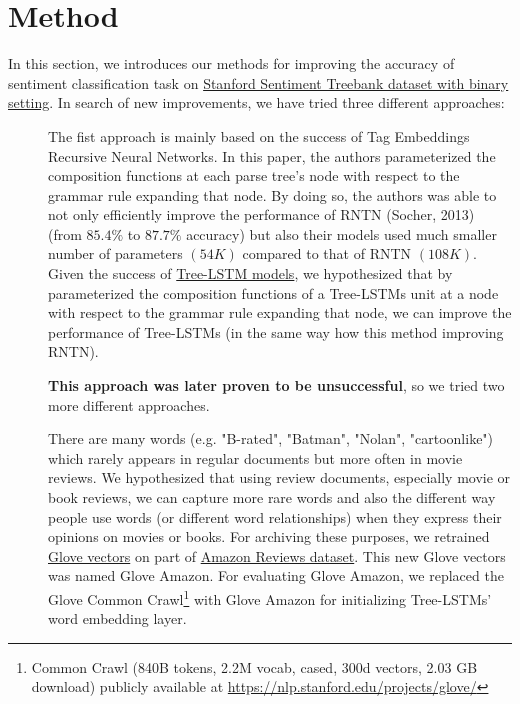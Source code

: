 \hypertarget{chap:method}{\chapter{Method}}\label{method}
In this section, we introduces our methods for improving the accuracy of sentiment classification task on \hyperref[sec:sst]{Stanford Sentiment Treebank dataset with binary setting}.
In search of new improvements, we have tried three different approaches:
\begin{description}
\item[] The fist approach is mainly based on the success of Tag Embeddings Recursive Neural Networks\cite{tag-embedding-rnn}.
In this paper, the authors parameterized the composition functions at each parse tree's node with respect to the grammar rule expanding that node. 
By doing so, the authors was able to not only efficiently improve the performance of RNTN (Socher, 2013)\cite{socher2013recursive} (from \(85.4\%\) to \(87.7\%\) accuracy) but also their models used much smaller number of parameters \((54K)\) compared to that of RNTN \((108K)\)\cite{tag-embedding-rnn}.
Given the success of \hyperref[sec:treelstm]{Tree-LSTM models}, we hypothesized that by parameterized the composition functions of a Tree-LSTMs unit at a node with respect to the grammar rule expanding that node, we can improve the performance of Tree-LSTMs (in the same way how this method improving RNTN).

\textbf{This approach was later proven to be unsuccessful}, so we tried two more different approaches.

\item[] There are many words (e.g. "B-rated", "Batman", "Nolan", "cartoonlike") which rarely appears in regular documents but more often in movie reviews.
We hypothesized that using review documents, especially movie or book reviews, we can capture more rare words and also the different way people use words (or different word relationships) when they express their opinions on movies or books.
For archiving these purposes, we retrained \hyperref[sec:glove]{Glove vectors} on part of  \hyperref[sec:amazon]{Amazon Reviews dataset}.
This new Glove vectors was named Glove Amazon.
For evaluating Glove Amazon, we replaced the Glove Common Crawl\footnote{Common Crawl (840B tokens, 2.2M vocab, cased, 300d vectors, 2.03 GB download) publicly available at \url{https://nlp.stanford.edu/projects/glove/}} with Glove Amazon for initializing Tree-LSTMs' word embedding layer.


\end{description}
